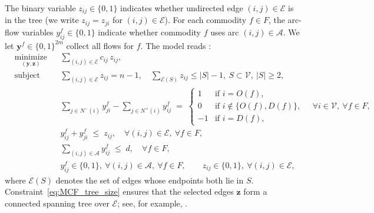 \documentclass[11pt,a4paper]{article}
\theoremstyle{plain}
\theoremstyle{definition}
\theoremstyle{remark}
\begin{document}
	The binary variable \(z_{ij}\in\{0,1\}\) indicates whether undirected edge $(i,j)\in\mathcal{E}$ is in the tree (we write \(z_{ij}=z_{ji}\) for $(i,j)\in\mathcal{E}$).
	For each commodity \(f\in F\), the arc-flow variables \(y_{ij}^f\in\{0,1\}\) indicate whether commodity \(f\) uses arc \((i,j)\in\mathcal{A}\).
	We let \(\boldsymbol{y}^f\in\{0,1\}^{2m}\) collect all flows for \(f\).
	The model reads \cite{gouveia1996multicommodity,gouveia2003network,dahl2006formulations}:
	\begin{subequations}\label{eq:MCF}
		\begin{align}
			& \underset{(\boldsymbol{y},\boldsymbol{z})}{\text{minimize}}
			&& \sum_{(i,j)\in\mathcal{E}} c_{ij}\, z_{ij}, \label{eq:MCF_obj}\\[0.3em]
			& \text{subject to}
			&& \sum_{(i,j)\in\mathcal{E}} z_{ij} = n-1,\quad \sum_{\mathcal{E}(S)}z_{ij}\leq|S|-1,\ S\subset\mathcal{V}, \ |S|\geq2, \label{eq:MCF_tree_size}\\[0.3em]
			&&& \sum_{j\in N^{-}(i)} y_{ji}^{f} - \sum_{j\in N^{+}(i)} y_{ij}^{f} \;=\;
			\begin{cases}
				1  & \text{if } i=O(f),\\
				0  & \text{if } i\notin\{O(f),D(f)\},\\
				-1 & \text{if } i=D(f),
			\end{cases}
			\quad \forall i\in\mathcal{V},\ \forall f\in F, \label{eq:MCF_flow_conservation}\\[0.5em]
			&&& y_{ij}^{f} + y_{ji}^{f} \;\le\; z_{ij},
			\quad \forall (i,j)\in\mathcal{E},\ \forall f\in F, \label{eq:MCF_edge_activation}\\[0.3em]
			&&& \sum_{(i,j)\in\mathcal{A}} y_{ij}^{f} \;\le\; d,
			\quad \forall f\in F, \label{eq:MCF_diameter}\\[0.3em]
			&&& y_{ij}^{f}\in\{0,1\},\ \forall (i,j)\in\mathcal{A},\ \forall f\in F,\qquad
			z_{ij}\in\{0,1\},\ \forall (i,j)\in\mathcal{E},
			\label{eq:MCF_binary}
		\end{align}
	\end{subequations}
	where $\mathcal{E}(S)$ denotes the set of edges whose endpoints both lie in $S$. 
	Constraint~\eqref{eq:MCF_tree_size} ensures that the selected edges 
	$\boldsymbol{z}$ form a connected spanning tree over $\mathcal{E}$; 
	see, for example, \cite{myung1995generalized,abdelmaguid2018efficient}.
	
\end{document}
